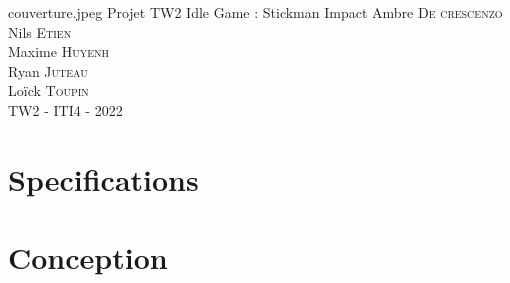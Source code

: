 \documentclass[11pt,a4paper]{article}
\author{ADC-NE-MH-RJ}
\begin{document}
\PageDeGarde
{couverture.jpeg} %
{Projet TW2} %
{Idle Game : Stickman Impact} %
{
Ambre \textsc{De crescenzo}\\
Nils \textsc{Etien}\\
Maxime \textsc{Huyenh}\\%
Ryan \textsc{Juteau}\\
Loïck \textsc{Toupin}\\
}
{TW2 - ITI4 - 2022} %



\tableofcontents

\clearpage




\clearpage

\section{Specifications}



\clearpage


\clearpage


\clearpage


\clearpage

\section{Conception}



\clearpage


\clearpage


\clearpage

\end{document}
